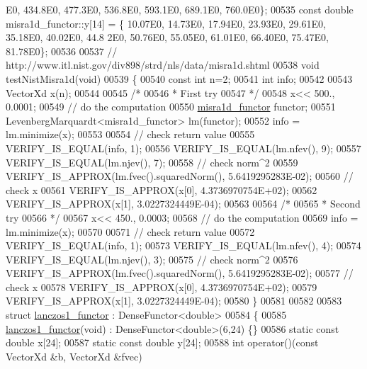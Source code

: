 \begin{DoxyCode}
      E0, 434.8E0, 477.3E0, 536.8E0, 593.1E0, 689.1E0, 760.0E0\};
00535 \textcolor{keyword}{const} \textcolor{keywordtype}{double} misra1d\_functor::y[14] = \{ 10.07E0, 14.73E0, 17.94E0, 23.93E0, 29.61E0, 35.18E0, 40.02E0, 44.8
      2E0, 50.76E0, 55.05E0, 61.01E0, 66.40E0, 75.47E0, 81.78E0\};
00536 
00537 \textcolor{comment}{// http://www.itl.nist.gov/div898/strd/nls/data/misra1d.shtml}
00538 \textcolor{keywordtype}{void} testNistMisra1d(\textcolor{keywordtype}{void})
00539 \{
00540   \textcolor{keyword}{const} \textcolor{keywordtype}{int} n=2;
00541   \textcolor{keywordtype}{int} info;
00542 
00543   VectorXd x(n);
00544 
00545   \textcolor{comment}{/*}
00546 \textcolor{comment}{   * First try}
00547 \textcolor{comment}{   */}
00548   x<< 500., 0.0001;
00549   \textcolor{comment}{// do the computation}
00550   \hyperlink{structmisra1d__functor}{misra1d\_functor} functor;
00551   LevenbergMarquardt<misra1d\_functor> lm(functor);
00552   info = lm.minimize(x);
00553 
00554   \textcolor{comment}{// check return value}
00555   VERIFY\_IS\_EQUAL(info, 1);
00556   VERIFY\_IS\_EQUAL(lm.nfev(), 9);
00557   VERIFY\_IS\_EQUAL(lm.njev(), 7);
00558   \textcolor{comment}{// check norm^2}
00559   VERIFY\_IS\_APPROX(lm.fvec().squaredNorm(), 5.6419295283E-02);
00560   \textcolor{comment}{// check x}
00561   VERIFY\_IS\_APPROX(x[0], 4.3736970754E+02);
00562   VERIFY\_IS\_APPROX(x[1], 3.0227324449E-04);
00563 
00564   \textcolor{comment}{/*}
00565 \textcolor{comment}{   * Second try}
00566 \textcolor{comment}{   */}
00567   x<< 450., 0.0003;
00568   \textcolor{comment}{// do the computation}
00569   info = lm.minimize(x);
00570 
00571   \textcolor{comment}{// check return value}
00572   VERIFY\_IS\_EQUAL(info, 1);
00573   VERIFY\_IS\_EQUAL(lm.nfev(), 4);
00574   VERIFY\_IS\_EQUAL(lm.njev(), 3);
00575   \textcolor{comment}{// check norm^2}
00576   VERIFY\_IS\_APPROX(lm.fvec().squaredNorm(), 5.6419295283E-02);
00577   \textcolor{comment}{// check x}
00578   VERIFY\_IS\_APPROX(x[0], 4.3736970754E+02);
00579   VERIFY\_IS\_APPROX(x[1], 3.0227324449E-04);
00580 \}
00581 
00582 
00583 \textcolor{keyword}{struct }\hyperlink{structlanczos1__functor}{lanczos1\_functor} : DenseFunctor<double>
00584 \{
00585     \hyperlink{structlanczos1__functor}{lanczos1\_functor}(\textcolor{keywordtype}{void}) : DenseFunctor<double>(6,24) \{\}
00586     \textcolor{keyword}{static} \textcolor{keyword}{const} \textcolor{keywordtype}{double} x[24];
00587     \textcolor{keyword}{static} \textcolor{keyword}{const} \textcolor{keywordtype}{double} y[24];
00588     \textcolor{keywordtype}{int} operator()(\textcolor{keyword}{const} VectorXd &b, VectorXd &fvec)

\end{DoxyCode}
